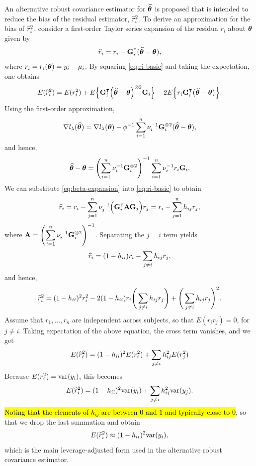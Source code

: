 An alternative robust covariance estimator for $\widehat{\bm\theta}$ is proposed that is intended to reduce the bias of the residual estimator, $\widehat r_i^2$. To derive an approximation for the bias of $\widehat r_i^2$, consider a first-order Taylor series expansion of the residua $r_i$ about $\bm\theta$ given by
\begin{equation}
	\widehat r_i = r_i-\mathbf{G}_i^\intercal(\widehat{\bm\theta}-\bm\theta), \label{eq:ri-basic}
\end{equation}
where $r_i = r_i(\bm\theta) = y_i - \mu_i$. By squaring \eqref{eq:ri-basic} and taking the expectation, one obtains
\begin{equation*}
	E(\widehat r_i^2) = E(r_i^2)+ E\Bigl\{\mathbf{G}_i^\intercal\Big(\widehat{\bm\theta}-\bm\theta\Big)^{\otimes 2}\mathbf{G}_i\Bigr\}-2E\Big\{r_i\mathbf{G}_i^\intercal\big(\widehat{\bm\theta}-\bm\theta\big)\Big\}.
\end{equation*}
Using the first-order approximation, 
$$
\nabla l_\lambda(\widehat{\bm\theta})= \nabla l_\lambda(\bm\theta) -\phi^{-1}\sum_{i=1}^n\nu_i^{-1}\mathbf{G}_i^{\otimes 2}(\widehat{\bm\theta}-\bm\theta), 
$$
and hence,
\begin{equation}
\widehat{\bm\theta}-\bm\theta =  \left(\sum_{i=1}^n\nu_i^{-1}\mathbf{G}_i^{\otimes 2}\right)^{-1}\sum_{i=1}^{n}\nu_i^{-1}r_i\mathbf{G}_i. \label{eq:beta-expansion}
\end{equation}
We can substitute \eqref{eq:beta-expansion} into \eqref{eq:ri-basic} to obtain
$$
\widehat r_i = r_i - \sum_{j=1}^n \nu_j^{-1}\Big(\mathbf{G}_i^\intercal\mathbf{A}\mathbf{G}_j\Big) r_j = r_i - \sum_{j=1}^n h_{ij} r_j,
$$
where $\displaystyle\mathbf{A} =  \left(\sum_{i=1}^n\nu_i^{-1}\mathbf{G}_i^{\otimes 2}\right)^{-1}$. 
Separating the $j=i$ term yields
\begin{equation*}
	\widehat r_i = (1 - h_{ii}) r_i - \sum_{j\neq i} h_{ij} r_j,
	\label{eq:ri-split}
\end{equation*}
and hence,  
\begin{equation*}
	\widehat r_i^ 2 = (1 - h_{ii})^2 r_i^2 - 2(1 - h_{ii}) r_i \Bigg(\sum_{j\neq i} h_{ij}r_j \Bigg)  + \Bigg(\sum_{j\neq i} h_{ij} r_j \Bigg)^2.
\end{equation*}
Assume that $r_1,\ldots,r_n$ are independent across subjects, so that $E(r_i r_j) = 0$, for $j\neq i$. Taking expectation of the above equation, the cross term vanishes, and we get
$$ 
E(\widehat r_i^2) = (1 - h_{ii})^2 E(r_i^2)+ \sum_{j\neq i} h_{ij}^2 E(r_j^2)
$$ 
Because $E(r_i^2) = \text{var}(y_i)$, this becomes
$$ 
E(\widehat r_i^2) = (1 - h_{ii})^2\text{var}(y_i) + \sum_{j\neq i} h_{ij}^2 \text{var}(y_j).
$$ 
\hl{Noting that the elements of $h_{ij}$ are between $0$ and $1$ and typically close to $0$}, so that we drop the last summation and obtain 
\begin{equation}
E(\widehat r_i^2) \approx (1 - h_{ii})^2\text{var}(y_i), \label{varapprox}
\end{equation}
which is the main leverage-adjusted form used in the alternative robust covariance estimator.


